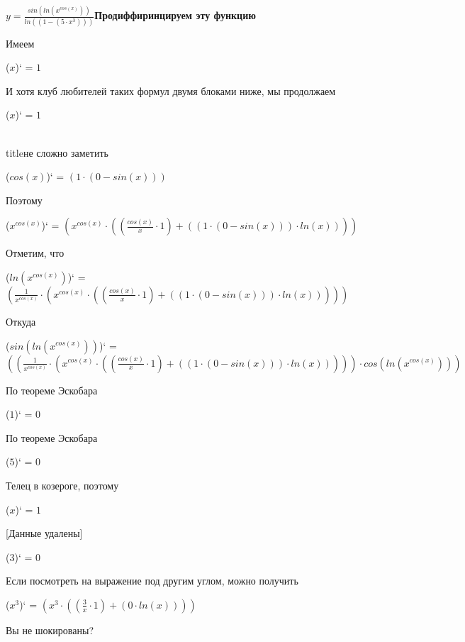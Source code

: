 \documentclass[12pt,a4paper,fleqn]{article}
\begin{document}
$y = $$\frac{sin(ln(x^{cos(x)}))}{ln((1 - (5 \cdot x^{3})))}$\newpage \textbf{\Huge Продиффиринцируем эту функцию}

Имеем

\begin{center}
($x$)`
 = $1$\end{center}
И хотя клуб любителей таких формул двумя блоками ниже, мы продолжаем

\begin{center}
($x$)`
 = $1$\end{center}
\\ title{не сложно заметить} 

\begin{center}
($cos(x)$)`
 = $(1 \cdot (0 - sin(x)))$\end{center}
Поэтому

\begin{center}
($x^{cos(x)}$)`
 = $(x^{cos(x)} \cdot ((\frac{cos(x)}{x} \cdot 1) + ((1 \cdot (0 - sin(x))) \cdot ln(x))))$\end{center}
Отметим, что

\begin{center}
($ln(x^{cos(x)})$)`
 = $(\frac{1}{x^{cos(x)}} \cdot (x^{cos(x)} \cdot ((\frac{cos(x)}{x} \cdot 1) + ((1 \cdot (0 - sin(x))) \cdot ln(x)))))$\end{center}
Откуда

\begin{center}
($sin(ln(x^{cos(x)}))$)`
 = $((\frac{1}{x^{cos(x)}} \cdot (x^{cos(x)} \cdot ((\frac{cos(x)}{x} \cdot 1) + ((1 \cdot (0 - sin(x))) \cdot ln(x))))) \cdot cos(ln(x^{cos(x)})))$\end{center}
По теореме Эскобара

\begin{center}
($1$)`
 = $0$\end{center}
По теореме Эскобара

\begin{center}
($5$)`
 = $0$\end{center}
Телец в козероге, поэтому

\begin{center}
($x$)`
 = $1$\end{center}
[Данные удалены]

\begin{center}
($3$)`
 = $0$\end{center}
Если посмотреть на выражение под другим углом, можно получить

\begin{center}
($x^{3}$)`
 = $(x^{3} \cdot ((\frac{3}{x} \cdot 1) + (0 \cdot ln(x))))$\end{center}
Вы не шокированы?
\end{document}
